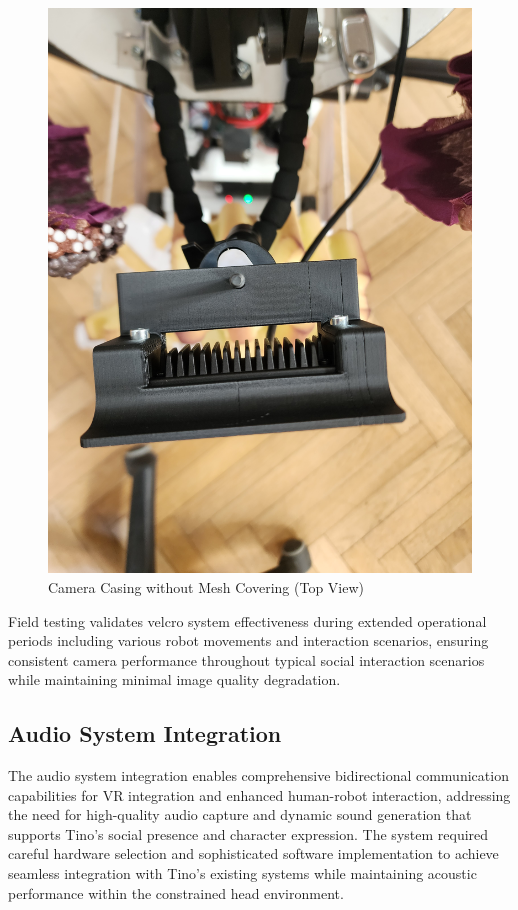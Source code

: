 \begin{figure}[H]
\begin{minipage}{0.45\textwidth}
        \includegraphics[width=\textwidth, angle=-90]{Images/CameraCasingNoMesh (3).jpg}
        \caption{Camera Casing without Mesh Covering (Top View)}
        \label{fig:camera_casing_no_mesh_top}
    \end{minipage}
\end{figure}

Field testing validates velcro system effectiveness during extended operational periods including various robot movements and interaction scenarios, ensuring consistent camera performance throughout typical social interaction scenarios while maintaining minimal image quality degradation.

\subsection{Audio System Integration}

The audio system integration enables comprehensive bidirectional communication capabilities for VR integration and enhanced human-robot interaction, addressing the need for high-quality audio capture and dynamic sound generation that supports Tino's social presence and character expression. The system required careful hardware selection and sophisticated software implementation to achieve seamless integration with Tino's existing systems while maintaining acoustic performance within the constrained head environment.

